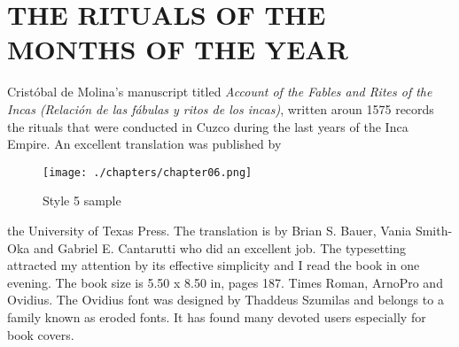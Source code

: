 

\chapter{THE RITUALS OF THE MONTHS OF THE YEAR}
\renewcommand{\DefaultLhang}{0.1}
\renewcommand{\LettrineFontHook}{\calligra}
\setlength{\DefaultFindent}{9.5pt}
\setlength{\DefaultNindent}{0pt}
\renewcommand{\LettrineFontHook}{\ovidius}
\lettrine[loversize=0.6]{\textcolor{thegray!60}{C}}{}rist\'obal de Molina’s manuscript titled \emph{Account of the Fables and Rites of the Incas (Relación
de las fábulas y ritos de los incas)}, written aroun 1575 records the rituals that were conducted in Cuzco during the last years of the Inca Empire. An excellent translation was published by
\begin{figure}[ht]
\centering
\texttt{[image: ./chapters/chapter06.png]}
\caption{Style 5 sample}
\end{figure}
the University of Texas Press. The translation is by Brian S. Bauer, Vania Smith-Oka and Gabriel E. Cantarutti who did an excellent job. The typesetting attracted my attention by its effective simplicity and I read the book in one evening. The book size is 5.50 x 8.50 in, pages 187. Times Roman, ArnoPro and Ovidius. The Ovidius font was designed by  Thaddeus Szumilas and 
belongs to a family known as eroded fonts. It has found many devoted users especially for book covers.

